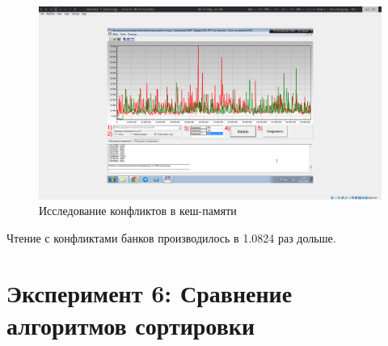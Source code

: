 \documentclass[a4paper,oneside,14pt]{extarticle}
\begin{document}
\begin{figure}[H]
	\centering
	\includegraphics[width=1\textwidth]{img/5.png}
    \caption{Исследование конфликтов в кеш-памяти}
	\label{fig:5}
\end{figure}

Чтение с конфликтами банков производилось в 1.0824 раз дольше.







\newpage

\section{Эксперимент 6: Сравнение алгоритмов сортировки}
\end{document}
